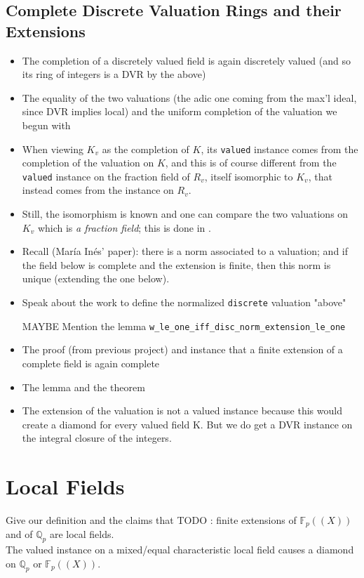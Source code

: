\documentclass[sigplan,10pt,anonymous,review]{acmart}\settopmatter{printfolios=true,printccs=false,printacmref=false}
\newcommand{\mi}[1]{{\color{purple} #1}}
\newcommand*{\QQ}{\mathbb{Q}}
\newcommand*{\FF}[1][p]{\mathbb{F}_{#1}}
\newcommand*{\laurentseries}[1][{\FF}]{#1(\!(X)\!)}
\begin{document}
\subsection{Complete Discrete Valuation Rings and their Extensions}
\begin{itemize}
	\item The completion of a discretely valued field is again discretely valued (and so its ring of integers is a DVR by the above)
	\item The equality of the two valuations (the adic one coming from the max'l ideal, since DVR implies local) and the uniform completion of the valuation we begun with
	\item When viewing $K_v$ as the completion of $K$, its \texttt{valued} instance comes from the completion of the valuation on $K$, and this is of course different from the \texttt{valued} instance on the fraction field of $R_v$, itself isomorphic to $K_v$, that instead comes from the  instance on $R_v$.
	\item Still, the isomorphism is known and one can compare the two valuations on $K_v$ which is \emph{a fraction field}; this is done in .
	\item Recall (María Inés' paper): there is a norm associated to a valuation; and if the field below is complete and the extension is finite, then this norm is unique (extending the one below).
	\item Speak about the work to define the normalized \texttt{discrete} valuation "above"
	\item [MAYBE] Mention the lemma \texttt{w\_le\_one\_iff\_disc\_norm\_extension\_le\_one}
	\item The proof (from previous project) and instance that a finite extension of a complete field is again complete
	\item The lemma  and the theorem 
	\item The extension of the valuation is not a valued instance because this would create a diamond for every valued field K. But we do get a DVR instance on the integral closure of the integers.
\end{itemize}
\section{Local Fields}
Give our definition and the claims that \mi{TODO : finite extensions of $\laurentseries$ and of $\QQ_p$ are local fields.}\\
The valued instance on a mixed/equal characteristic local field causes a diamond on $\QQ_p$ or
$\laurentseries$.
\end{document}
